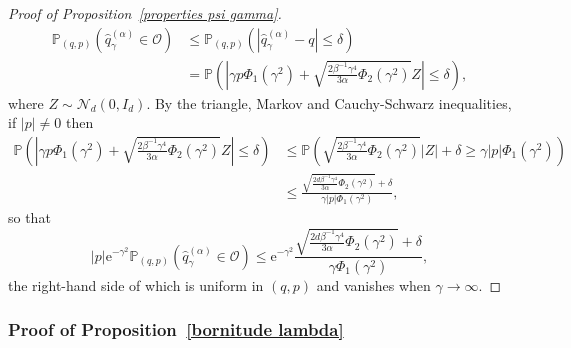 \documentclass[preprint,EJP]{ejpecp}
\begin{document}
\begin{proof}[Proof of Proposition~\ref{properties psi gamma}]
\begin{align*}
  \mathbb{P}_{(q,p)}\left(\widehat{q}^{(\alpha)}_\gamma \in \mathcal{O}\right) &\leq \mathbb{P}_{(q,p)}\left(|\widehat{q}^{(\alpha)}_\gamma-q| \leq \delta\right)\\
  &= \mathbb{P}\left(\left|\gamma p \Phi_1(\gamma^2) + \sqrt{\frac{2\beta^{-1}\gamma^4}{3\alpha} \Phi_2(\gamma^2)}Z\right| \leq \delta\right), 
\end{align*}
where $Z \sim \mathcal{N}_d(0,I_d)$. By the triangle, Markov and Cauchy-Schwarz inequalities, if $|p|\not=0$ then
\begin{align*}
  \mathbb{P}\left(\left|\gamma p \Phi_1(\gamma^2) + \sqrt{\frac{2\beta^{-1}\gamma^4}{3\alpha} \Phi_2(\gamma^2)}Z\right| \leq \delta\right) &\leq \mathbb{P}\left(\sqrt{\frac{2\beta^{-1}\gamma^4}{3\alpha} \Phi_2(\gamma^2)} |Z| + \delta \geq \gamma |p| \Phi_1(\gamma^2)\right)\\
  &\leq \frac{\sqrt{\frac{2d\beta^{-1}\gamma^4}{3\alpha} \Phi_2(\gamma^2)} + \delta}{\gamma |p| \Phi_1(\gamma^2)},
\end{align*}
so that
\begin{equation*}
  |p|\mathrm{e}^{-\gamma^2}\mathbb{P}_{(q,p)}\left(\widehat{q}^{(\alpha)}_\gamma \in \mathcal{O}\right) \leq \mathrm{e}^{-\gamma^2}\frac{\sqrt{\frac{2d\beta^{-1}\gamma^4}{3\alpha} \Phi_2(\gamma^2)} + \delta}{\gamma \Phi_1(\gamma^2)},
\end{equation*}
the right-hand side of which is uniform in $(q,p)$ and vanishes when $\gamma \to \infty$.
\end{proof}


\subsubsection{Proof of Proposition~\ref{bornitude lambda}}
\end{document}
